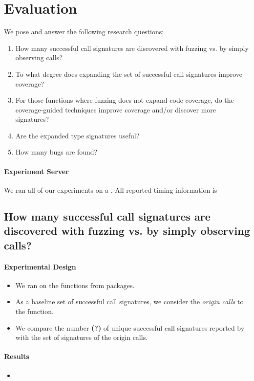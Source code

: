 \section{Evaluation}

We pose and answer the following research questions:

\begin{enumerate}
    \item How many successful call signatures are discovered with fuzzing vs. by simply observing calls?
    \item To what degree does expanding the set of successful call signatures improve coverage?
    \item For those functions where fuzzing does not expand code coverage, do the coverage-guided techniques improve coverage and/or discover more signatures?
    \item Are the expanded type signatures useful? 
    \item How many bugs are found?
\end{enumerate}

\paragraph{Experiment Server} 
We ran all of our experiments on a .
All reported timing information is 

%
%

\subsection{How many successful call signatures are discovered with fuzzing vs. by simply observing calls?}

\paragraph{Experimental Design}
\begin{itemize}
    \item We ran \tool on the   functions from  packages.
    \item As a baseline set of successful call signatures, we consider the \textit{origin calls} to the function.
    \item We compare the number \textbf{(?)} of unique successful call signatures reported by \tool with the set of signatures of the origin calls.
\end{itemize}

\paragraph{Results}

\begin{itemize}
    \item {}
\end{itemize}
